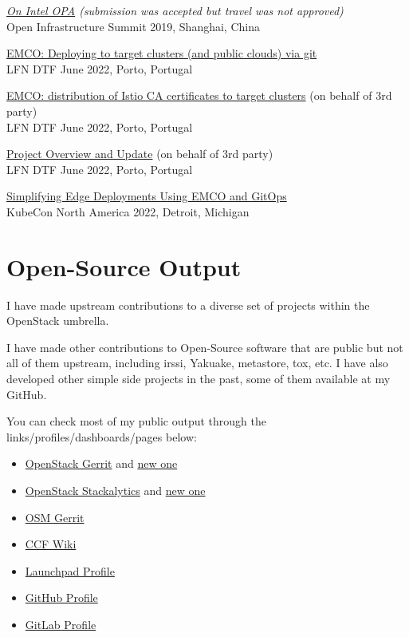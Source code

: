 \documentclass[letter,10pt]{article} %
\begin{document}
\textit{\href{https://www.slideshare.net/igordcard/cloud-sdn-nfv}{On Intel OPA} (submission was accepted but travel was not approved)}\\
Open Infrastructure Summit 2019,  Shanghai, China

\href{https://wiki.lfnetworking.org/pages/viewpage.action?pageId=65537697}{EMCO: Deploying to target clusters (and public clouds) via git}\\
LFN DTF June 2022, Porto, Portugal

\href{https://wiki.lfnetworking.org/pages/viewpage.action?pageId=65537697}{EMCO: distribution of Istio CA certificates to target clusters} (on behalf of 3rd party)\\
LFN DTF June 2022, Porto, Portugal

\href{https://wiki.lfnetworking.org/pages/viewpage.action?pageId=65537697}{Project Overview and Update} (on behalf of 3rd party)\\
LFN DTF June 2022, Porto, Portugal

\href{https://gitopsconna22.sched.com/event/1AR8V}{Simplifying Edge Deployments Using EMCO and GitOps}\\
KubeCon North America 2022, Detroit, Michigan\\


\section{Open-Source Output}
I have made upstream contributions to a diverse set of projects within the OpenStack umbrella.

I have made other contributions to Open-Source software that are public but not all of them upstream, including irssi, Yakuake, metastore, tox, etc. I have also developed other simple side projects in the past, some of them available at my GitHub.

You can check most of my public output through the links/profiles/dashboards/pages below:
\begin{itemize}
    \item \href{https://review.openstack.org/#/q/owner:igordcard}{OpenStack Gerrit} and \href{https://review.openstack.org/#/q/owner:igordc}{new one}
    \item \href{http://stackalytics.com/?user_id=igordcard&metric=marks&release=all}{OpenStack Stackalytics} and \href{http://stackalytics.com/?user_id=igordc&metric=marks&release=all}{new one}
    \item \href{https://osm.etsi.org/gerrit/#/q/owner:cardosoi}{OSM Gerrit}
    \item \href{https://wiki.openstack.org/wiki/Neutron/CommonClassificationFramework}{CCF Wiki}
    \item \href{https://launchpad.net/~igordcard}{Launchpad Profile}
    \item \href{https://github.com/igordcard}{GitHub Profile}
    \item \href{https://gitlab.com/igordc}{GitLab Profile}
\end{itemize}
\end{document}
